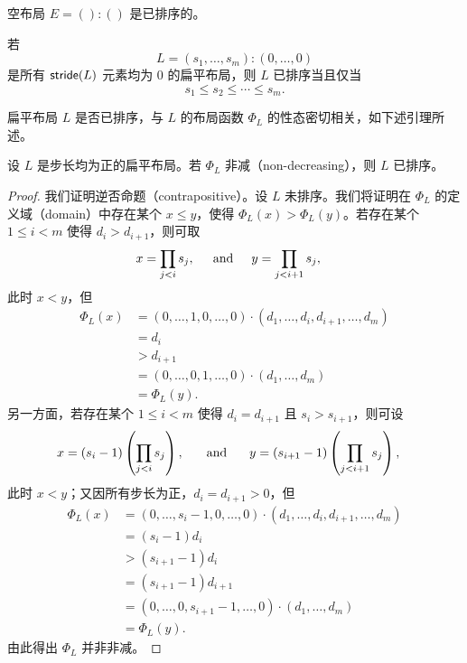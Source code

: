 \begin{example}
    空布局 $E = ():()$ 是已排序的。
\end{example}

\begin{example}
    若
    \[L = (s_1,\dots,s_m):(0,\dots,0)\]
    是所有 $\mathsf{stride}(L)$ 元素均为 $0$ 的扁平布局，则 $L$ 已排序当且仅当
    \[
    s_1 \leq s_2 \leq \cdots \leq s_m.
    \]
\end{example}

扁平布局 $L$ 是否已排序，与 $L$ 的布局函数 $\Phi_L$ 的性态密切相关，如下述引理所述。
\begin{lemma}
    设 $L$ 是步长均为正的扁平布局。若 $\Phi_L$ 非减（non-decreasing），则 $L$ 已排序。
\end{lemma}
\begin{proof}
我们证明逆否命题（contrapositive）。设 $L$ 未排序。我们将证明在 $\Phi_L$ 的定义域（domain）中存在某个 $x \leq y$，使得 $\Phi_L(x)>\Phi_L(y)$。若存在某个 $1 \leq i < m$ 使得 $d_i > d_{i+1}$，则可取
    \begin{align*}
    x & = \prod_{j<i}s_j, \hspace{0.2in}\text{and}\hspace{0.2in} y = \prod_{j<i+1}s_j,
    \end{align*}
    此时 $x < y$，但
    \begin{align*}
    \Phi_L(x) & = (0,\dots,1,0,\dots,0) \cdot (d_1,\dots,d_i,d_{i+1},\dots,d_m) \\
    & = d_i\\
    & > d_{i+1}\\
    & = (0,\dots,0,1,\dots,0) \cdot (d_1,\dots,d_m)\\
    & = \Phi_L(y).
    \end{align*}
    另一方面，若存在某个 $1 \leq i < m$ 使得 $d_i = d_{i+1}$ 且 $s_i > s_{i+1}$，则可设
    \begin{align*}
    x & = (s_i-1)\left(\prod_{j<i} s_j\right),\hspace{0.2in} \text{ and } \hspace{0.2in}y = (s_{i+1} - 1)\left( \prod_{j<i+1}s_j\right),
\end{align*}
    此时 $x < y$；又因所有步长为正，$d_i=d_{i+1}>0$，但
    \begin{align*}
    \Phi_L(x) & = (0,\dots,s_i-1,0,\dots,0) \cdot (d_1,\dots,d_i,d_{i+1},\dots,d_m) \\
    & = (s_i-1)d_i\\
    & > (s_{i+1}-1)d_{i}\\
    & = (s_{i+1}-1)d_{i+1}\\
    & = (0,\dots,0,s_{i+1}-1,\dots,0) \cdot (d_1,\dots,d_m)\\
    & = \Phi_L(y).
    \end{align*}
    由此得出 $\Phi_L$ 并非非减。
\end{proof}

